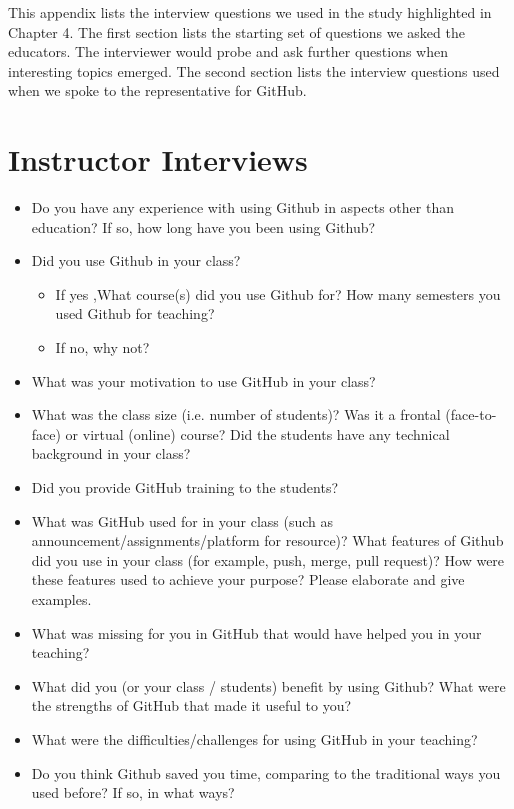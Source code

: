 
This appendix lists the interview questions we used in the study highlighted in Chapter 4. The first section lists the starting set of questions we asked the educators. The interviewer would probe and ask further questions when interesting topics emerged. The second section lists the interview questions used when we spoke to the representative for GitHub.

\section{Instructor Interviews}
\begin{itemize}
    \item Do you have any experience with using Github in aspects other than education? If so, how long have you been using Github?
    \item Did you use Github in your class?
    \begin{itemize}
        \item If yes ,What course(s) did you use Github for? How many semesters you used Github for teaching?
        \item If no, why not?
    \end{itemize}
    \item What was your motivation to use GitHub in your class?
    \item What was the class size (i.e. number of students)? Was it a frontal (face-to-face) or virtual (online) course? Did the students have any technical background in your class?
    \item Did you provide GitHub training to the students?
    \item What was GitHub used for in your class (such as announcement/assignments/platform for resource)? What features of Github did you use in your class (for example, push, merge, pull request)? How were these features used to achieve your purpose? Please elaborate and give examples.
    \item What was missing for you in GitHub that would have helped you in your teaching?
    \item What did you (or your class / students) benefit by using Github? What were the strengths of GitHub that made it useful to you?
    \item What were the difficulties/challenges for using GitHub in your teaching?
    \item Do you think Github saved you time, comparing to the traditional ways you used before? If so, in what ways?

\end{itemize}
